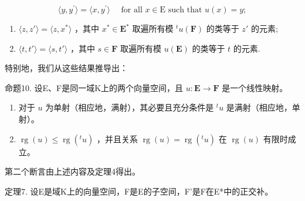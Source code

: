 \[
\langle y, y ^ {\prime} \rangle = \langle x, y ^ {\prime} \rangle \quad \text { for   all } x \in \mathrm{E} \text { such   that } u (x) = y;\tag{16}
\]

\begin{enumerate}
\def\labelenumi{(\arabic{enumi})}
\setcounter{enumi}{16}
\item
  \(\langle z, z' \rangle = \langle z, x^* \rangle\) ，其中 \(x^* \in \mathbf{E}^*\) 取遍所有模 \(^t u(\mathbf{F})\) 的类等于 \(z'\) 的元素;
\item
  \(\langle t, t' \rangle = \langle s, t' \rangle\) ，其中 \(s \in \mathbf{F}\) 取遍所有模 \(u(\mathbf{E})\) 的类等于 \(t\) 的元素.
\end{enumerate}

特别地，我们从这些结果推导出：

命题10. 设E、F是同一域K上的两个向量空间，且 \(u: \mathbf{E} \to \mathbf{F}\) 是一个线性映射。

\begin{enumerate}
\def\labelenumi{(\roman{enumi})}
\item
  对于 \(u\) 为单射（相应地，满射），其必要且充分条件是 \(^{t}u\) 是满射（相应地，单射）。
\item
  \(\operatorname{rg}(u) \leqslant \operatorname{rg}(^t u)\) ，并且关系 \(\operatorname{rg}(u) = \operatorname{rg}(^t u)\) 在 \(\operatorname{rg}(u)\) 有限时成立。
\end{enumerate}

第二个断言由上述内容及定理4得出。

定理7. 设E是域K上的向量空间，F是E的子空间，F'是F在E*中的正交补。

